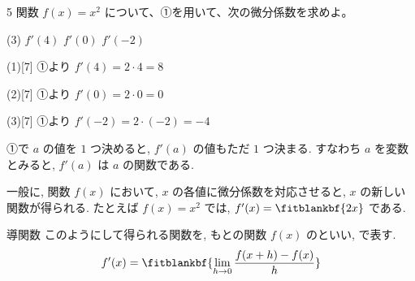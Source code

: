 \documentclass[14pt,dvipdfmx]{jsarticle}
\begin{document}
\vspace{-1.4zw}%
\begin{practiceprob}{5}
  関数 $f(x)=x^{2}$ について、①を用いて、次の微分係数を求めよ。
  \begin{tasks}[label=(\arabic*), label-width=1.6zw, item-indent=2zw, after-item-skip=0.12em](3)
    \task $f'(4)$
    \task $f'(0)$
    \task $f'(-2)$
  \end{tasks}
\end{practiceprob}
\vspace{-0.25em}
\begin{answerbox}{(1)}[7]
  ①より $f'(4)=2\cdot 4=8$
\end{answerbox}
\begin{answerbox}{(2)}[7]
  ①より $f'(0)=2\cdot 0=0$
\end{answerbox}
\begin{answerbox}{(3)}[7]
  ①より $f'(-2)=2\cdot(-2)=-4$
\end{answerbox}

\vspace{1em}
①で $a$ の値を $1$ つ決めると, $f'(a)$ の値もただ $1$ つ決まる.
すなわち $a$ を変数とみると, $f'(a)$ は $a$ の関数である.
\par\vspace{0.25em}
一般に, 関数 $f(x)$ において, $x$ の各値に微分係数を対応させると,
$x$ の新しい関数が得られる.
たとえば $f(x)=x^{2}$ では, $f'(x)=\fitblankbf{2x}$ である.

\vspace{0.25em}
\begin{definitionbox}{導関数}
  このようにして得られる関数を, もとの関数 $f(x)$ のといい,
   で表す.
  \[
    f'(x)=\fitblankbf{\lim_{h \to 0}\dfrac{f(x+h)-f(x)}{h}}
  \]
\end{definitionbox}

\vfill
\nextpage
\end{document}
